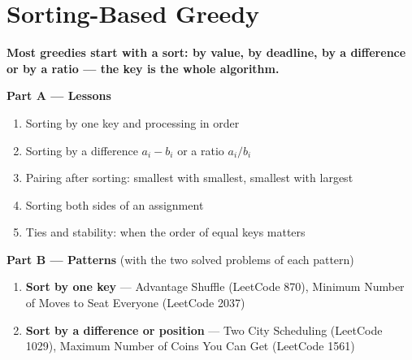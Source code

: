 \chapter{Sorting-Based Greedy}
\label{ch:sorting_greedy}

\begin{tcolorbox}[enhanced, colback=white, colframe=secondaryblue, boxrule=1pt, arc=2mm]
\textbf{\large\textcolor{primaryblue}{Most greedies start with a sort: by value, by deadline, by a difference or by a ratio --- the key is the whole algorithm.}}
\end{tcolorbox}


\begin{plannedbox}
\textbf{Part A --- Lessons}
\begin{enumerate}[leftmargin=*, label=\textbf{A\arabic*.}, itemsep=1pt]
    \item Sorting by one key and processing in order
    \item Sorting by a difference $a_i - b_i$ or a ratio $a_i / b_i$
    \item Pairing after sorting: smallest with smallest, smallest with largest
    \item Sorting both sides of an assignment
    \item Ties and stability: when the order of equal keys matters
\end{enumerate}
\textbf{Part B --- Patterns} (with the two solved problems of each pattern)
\begin{enumerate}[leftmargin=*, label=\textbf{P\arabic*.}, itemsep=1pt]
    \item \textbf{Sort by one key} --- Advantage Shuffle {\small\color{darkgray}(LeetCode 870)}, Minimum Number of Moves to Seat Everyone {\small\color{darkgray}(LeetCode 2037)}
    \item \textbf{Sort by a difference or position} --- Two City Scheduling {\small\color{darkgray}(LeetCode 1029)}, Maximum Number of Coins You Can Get {\small\color{darkgray}(LeetCode 1561)}
\end{enumerate}
\end{plannedbox}
